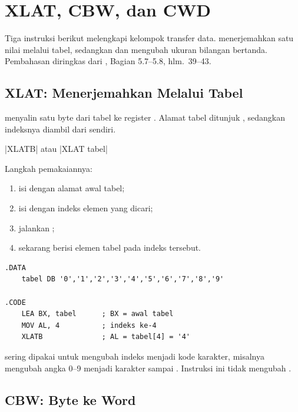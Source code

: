 \section{XLAT, CBW, dan CWD}
\label{sec:xlat-cbw-cwd}

Tiga instruksi berikut melengkapi kelompok transfer data. 
menerjemahkan satu nilai melalui tabel, sedangkan  dan
 mengubah ukuran bilangan bertanda. Pembahasan diringkas
dari \cite{gunawan2019}, Bagian 5.7--5.8, hlm.~39--43.

\subsection{XLAT: Menerjemahkan Melalui Tabel}

 menyalin satu byte dari tabel ke register .
Alamat tabel ditunjuk , sedangkan indeksnya diambil dari
 sendiri.

\begin{center}
\lstasm|XLATB| \quad atau \quad \lstasm|XLAT tabel|
\end{center}

Langkah pemakaiannya:

\begin{enumerate}
    \item isi  dengan alamat awal tabel;
    \item isi  dengan indeks elemen yang dicari;
    \item jalankan ;
    \item {} sekarang berisi elemen tabel pada indeks tersebut.
\end{enumerate}

\begin{lstlisting}[language=MASM, numbers=none]
.DATA
    tabel DB '0','1','2','3','4','5','6','7','8','9'

.CODE
    LEA BX, tabel      ; BX = awal tabel
    MOV AL, 4          ; indeks ke-4
    XLATB              ; AL = tabel[4] = '4'
\end{lstlisting}

 sering dipakai untuk mengubah indeks menjadi kode
karakter, misalnya mengubah angka 0--9 menjadi karakter 
sampai . Instruksi ini tidak mengubah .

\subsection{CBW: Byte ke Word}

